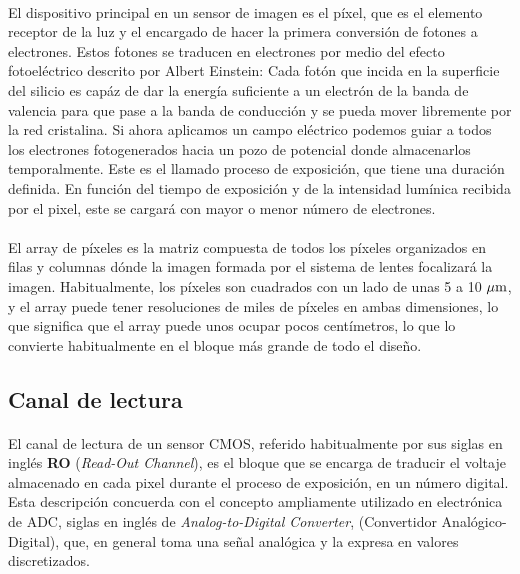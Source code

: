 \paragraph{}

El dispositivo principal en un sensor de imagen es el píxel, que es el elemento
receptor de la luz y el encargado de hacer la primera conversión de fotones a
electrones. Estos fotones se traducen en electrones por medio del efecto fotoeléctrico
descrito por Albert Einstein: Cada fotón que incida en la superficie del silicio
es capáz de dar la energía suficiente a un electrón de la banda de valencia para que
pase a la banda de conducción y se pueda mover libremente por la red cristalina.
Si ahora aplicamos un campo eléctrico podemos guiar a todos los electrones
fotogenerados hacia un pozo de potencial donde almacenarlos temporalmente. Este
es el llamado proceso de exposición, que tiene una duración definida. En función
del tiempo de exposición y de la intensidad lumínica recibida por el pixel, este
se cargará con mayor o menor número de electrones.

\paragraph{}
El array de píxeles es la matriz compuesta de todos los píxeles organizados en filas
y columnas dónde la imagen formada por el sistema de lentes focalizará la imagen.
Habitualmente, los píxeles son cuadrados con un lado de unas 5 a 10 $\mu\text{m}$, y el
array puede tener resoluciones de miles de píxeles en ambas dimensiones, lo que
significa que el array puede unos ocupar pocos centímetros, lo que lo convierte
habitualmente en el bloque más grande de todo el diseño.

\subsection{Canal de lectura}
\paragraph{}
El canal de lectura de un sensor CMOS, referido habitualmente por sus
siglas en inglés \textbf{RO} (\textit{Read-Out Channel}), es el bloque que se
encarga de traducir el voltaje almacenado en cada pixel durante el proceso
de exposición, en un número digital. Esta descripción concuerda con el concepto
ampliamente utilizado en electrónica de ADC, siglas en inglés de \textit{Analog-to-Digital
Converter}, (Convertidor Analógico-Digital), que, en general toma una señal
analógica y la expresa en valores discretizados.

